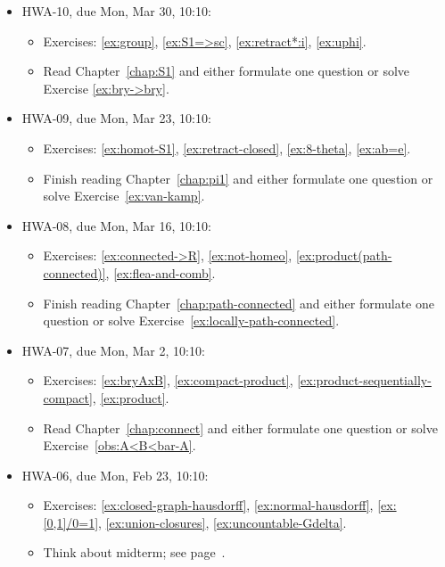 \begin{itemize}
\item HWA-10, due Mon, Mar 30, 10:10:
\begin{itemize}
\item Exercises: \ref{ex:group}, \ref{ex:S1=>sc}, \ref{ex:retract*:i}, \ref{ex:uphi}.
\item Read Chapter~\ref{chap:S1} and either formulate one question or solve Exercise \ref{ex:bry->bry}.
\end{itemize}

\item HWA-09, due Mon, Mar 23, 10:10:
\begin{itemize}
\item Exercises: \ref{ex:homot-S1}, \ref{ex:retract-closed}, \ref{ex:8-theta}, \ref{ex:ab=e}.
\item Finish reading Chapter~\ref{chap:pi1} and either formulate one question or solve Exercise~\ref{ex:van-kamp}.
\end{itemize}

\item HWA-08, due Mon, Mar 16, 10:10:
\begin{itemize}
\item Exercises: \ref{ex:connected->R}, \ref{ex:not-homeo}, \ref{ex:product(path-connected)}, \ref{ex:flea-and-comb}.
\item Finish reading Chapter~\ref{chap:path-connected} and either formulate one question or solve Exercise~\ref{ex:locally-path-connected}.
\end{itemize}

\item HWA-07, due Mon, Mar 2, 10:10:\begin{itemize}
\item Exercises: \ref{ex:bryAxB}, \ref{ex:compact-product}, \ref{ex:product-sequentially-compact}, \ref{ex:product}. \item Read Chapter~\ref{chap:connect} and either formulate one question or solve Exercise~\ref{obs:A<B<bar-A}. \end{itemize}

\item HWA-06, due Mon, Feb 23, 10:10:
\begin{itemize}
\item Exercises:
\ref{ex:closed-graph-hausdorff},
\ref{ex:normal-hausdorff},
\ref{ex:[0,1]/0=1},
\ref{ex:union-closures},
\ref{ex:uncountable-Gdelta}.
\item Think about midterm; see page~\pageref{MT1}.
\end{itemize}


\end{itemize}
